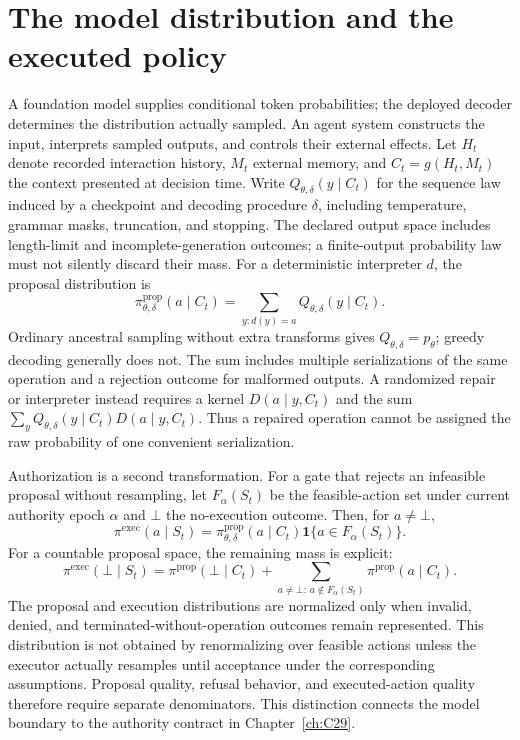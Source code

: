 \section{The model distribution and the executed policy}
\label{sec:C03:policy}
A foundation model supplies conditional token probabilities; the deployed decoder determines the distribution actually sampled. An agent system constructs the input, interprets sampled outputs, and controls their external effects. Let $H_t$ denote recorded interaction history, $M_t$ external memory, and $C_t=g(H_t,M_t)$ the context presented at decision time. Write $Q_{\theta,\delta}(y\mid C_t)$ for the sequence law induced by a checkpoint and decoding procedure $\delta$, including temperature, grammar masks, truncation, and stopping. The declared output space includes length-limit and incomplete-generation outcomes; a finite-output probability law must not silently discard their mass. For a deterministic interpreter $d$, the proposal distribution is
\begin{equation}
 \pi^{\mathrm{prop}}_{\theta,\delta}(a\mid C_t)
 =\sum_{y:d(y)=a}Q_{\theta,\delta}(y\mid C_t).
\end{equation}
Ordinary ancestral sampling without extra transforms gives $Q_{\theta,\delta}=p_\theta$; greedy decoding generally does not. The sum includes multiple serializations of the same operation and a rejection outcome for malformed outputs. A randomized repair or interpreter instead requires a kernel $D(a\mid y,C_t)$ and the sum $\sum_y Q_{\theta,\delta}(y\mid C_t)D(a\mid y,C_t)$. Thus a repaired operation cannot be assigned the raw probability of one convenient serialization.

Authorization is a second transformation. For a gate that rejects an infeasible proposal without resampling, let $F_\alpha(S_t)$ be the feasible-action set under current authority epoch $\alpha$ and $\bot$ the no-execution outcome. Then, for $a\ne\bot$,
\begin{equation}
 \pi^{\mathrm{exec}}(a\mid S_t)
 =\pi^{\mathrm{prop}}_{\theta,\delta}(a\mid C_t)
 \mathbf1\{a\in F_\alpha(S_t)\}.
\end{equation}
For a countable proposal space, the remaining mass is explicit:
\begin{equation}
 \pi^{\mathrm{exec}}(\bot\mid S_t)
 =\pi^{\mathrm{prop}}(\bot\mid C_t)
 +\sum_{a\ne\bot:\,a\notin F_\alpha(S_t)}
   \pi^{\mathrm{prop}}(a\mid C_t).
\end{equation}
The proposal and execution distributions are normalized only when invalid, denied, and terminated-without-operation outcomes remain represented. This distribution is not obtained by renormalizing over feasible actions unless the executor actually resamples until acceptance under the corresponding assumptions. Proposal quality, refusal behavior, and executed-action quality therefore require separate denominators. This distinction connects the model boundary to the authority contract in Chapter~\ref{ch:C29}.


